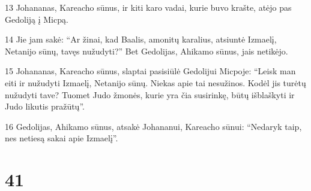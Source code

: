 \par 13 Johananas, Kareacho sūnus, ir kiti karo vadai, kurie buvo krašte, atėjo pas Gedoliją į Micpą. 
\par 14 Jie jam sakė: “Ar žinai, kad Baalis, amonitų karalius, atsiuntė Izmaelį, Netanijo sūnų, tavęs nužudyti?” Bet Gedolijas, Ahikamo sūnus, jais netikėjo. 
\par 15 Johananas, Kareacho sūnus, slaptai pasisiūlė Gedolijui Micpoje: “Leisk man eiti ir nužudyti Izmaelį, Netanijo sūnų. Niekas apie tai nesužinos. Kodėl jis turėtų nužudyti tave? Tuomet Judo žmonės, kurie yra čia susirinkę, būtų išblaškyti ir Judo likutis pražūtų”. 
\par 16 Gedolijas, Ahikamo sūnus, atsakė Johananui, Kareacho sūnui: “Nedaryk taip, nes netiesą sakai apie Izmaelį”.



\chapter{41}


